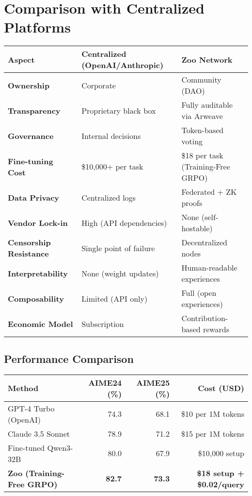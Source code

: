 \documentclass[11pt,a4paper]{article}
\begin{document}
\section{Comparison with Centralized Platforms}

\begin{center}
\small
\begin{tabular}{lp{3cm}p{3cm}}
\toprule
\textbf{Aspect} & \textbf{Centralized (OpenAI/Anthropic)} & \textbf{Zoo Network} \\
\midrule
\textbf{Ownership} & Corporate & Community (DAO) \\
\textbf{Transparency} & Proprietary black box & Fully auditable via Arweave \\
\textbf{Governance} & Internal decisions & Token-based voting \\
\textbf{Fine-tuning Cost} & \$10,000+ per task & \$18 per task (Training-Free GRPO) \\
\textbf{Data Privacy} & Centralized logs & Federated + ZK proofs \\
\textbf{Vendor Lock-in} & High (API dependencies) & None (self-hostable) \\
\textbf{Censorship Resistance} & Single point of failure & Decentralized nodes \\
\textbf{Interpretability} & None (weight updates) & Human-readable experiences \\
\textbf{Composability} & Limited (API only) & Full (open experiences) \\
\textbf{Economic Model} & Subscription & Contribution-based rewards \\
\bottomrule
\end{tabular}
\end{center}

\subsection{Performance Comparison}

\begin{center}
\begin{tabular}{lrrr}
\toprule
\textbf{Method} & \textbf{AIME24 (\%)} & \textbf{AIME25 (\%)} & \textbf{Cost (USD)} \\
\midrule
GPT-4 Turbo (OpenAI) & 74.3 & 68.1 & \$10 per 1M tokens \\
Claude 3.5 Sonnet & 78.9 & 71.2 & \$15 per 1M tokens \\
Fine-tuned Qwen3-32B & 80.0 & 67.9 & \$10,000 setup \\
\textbf{Zoo (Training-Free GRPO)} & \textbf{82.7} & \textbf{73.3} & \textbf{\$18 setup + \$0.02/query} \\
\bottomrule
\end{tabular}
\end{center}
\end{document}
